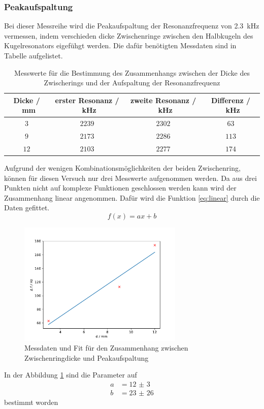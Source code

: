\subsubsection{Peakaufspaltung}
Bei dieser Messreihe wird die Peakaufspaltung der Resonanzfrequenz von \SI{2.3}{\kilo\hertz} vermessen, indem verschieden dicke 
Zwischenringe zwischen den Halbkugeln des Kugelresonators eigefühgt werden.
Die dafür benötigten Messdaten sind in Tabelle  aufgelistet.
\FloatBarrier
\begin{table}
    \centering
    \caption{Messwerte für die Bestimmung des Zusammenhangs zwischen der Dicke des Zwischerings und der Aufspaltung der Resonanzfrequenz}
    \begin{tabular}{c c c c}
        \toprule
        Dicke / \SI{}{\milli\meter}& erster Resonanz / \SI{}{\kilo\hertz}& zweite Resonanz / \SI{}{\kilo\hertz}& Differenz / \SI{}{\kilo\hertz}\\
        \midrule
        $\num{3}$ &$\num{2239}$&$\num{2302}$&$\num{63}$\\
        $\num{9}$ &$\num{2173}$&$\num{2286}$&$\num{113}$\\
        $\num{12}$&$\num{2103}$&$\num{2277}$&$\num{174}$\\
        \bottomrule
    \end{tabular}
\end{table}
\FloatBarrier
Aufgrund der wenigen Kombinationsmöglichkeiten der beiden Zwischenring, können für diesen Versuch nur drei Messwerte aufgenommen werden.
Da aus drei Punkten nicht auf komplexe Funktionen geschlossen werden kann wird der Zusammenhang linear angenommen.
Dafür wird die Funktion \eqref{eq:linear} durch die Daten gefittet.
\begin{equation}
    f\left(x\right) = ax +b
    \label{eq:linear}
\end{equation}
\FloatBarrier
\begin{figure}
    \centering
    \caption{Messdaten und Fit für den Zusammenhang zwischen Zwischenringdicke und Peakaufspaltung}
    \label{fig:Peakaufspaltung}
    \includegraphics[width=0.7\textwidth]{figure/Peak_Aufspaltung.pdf}
\end{figure}
\FloatBarrier
In der Abbildung \ref{fig:Peakaufspaltung} sind die Parameter auf 
\begin{align*}
    a&= \num{12(3)}\\
    b&= \num{23(26)}
\end{align*}
bestimmt worden

